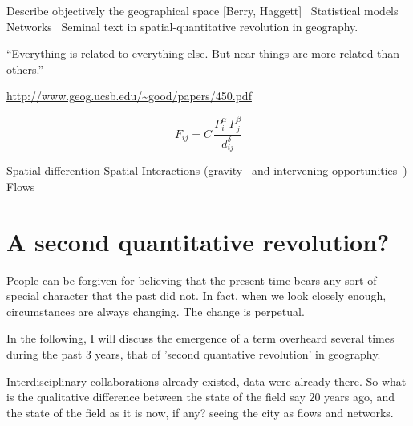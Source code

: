 Describe objectively the geographical space [Berry,
Haggett]~\cite{Hagget:1966,King:1966,Chorley:1967}
Statistical models~\cite{Brunsdon:1998}
Networks~\cite{Kansky:1963,Haggett:1969}
Seminal text in spatial-quantitative revolution in geography.~\cite{Bunge:1962}

\cite{Tobler:1970} ``Everything is related to everything else. But near things
are more related than others.''

\url{http://www.geog.ucsb.edu/~good/papers/450.pdf}

\begin{equation}
    F_{ij} = C\, \frac{P_i^\alpha\,P_j^\beta}{d_{ij}^\delta}
\end{equation}

Spatial differention
Spatial Interactions (gravity~\cite{Stewart:1948} and intervening opportunities~\cite{Stouffer:1940})
Flows~\cite{Batty:2013}

\section{A second quantitative revolution?}
\label{sec:a_second_quantitative_revolution_}

People can be forgiven for believing that the present time bears any sort of
special character that the past did not. In fact, when we look closely enough,
circumstances are always changing. The change is perpetual. 

In the following, I will discuss the emergence of a term overheard several times
during the past $3$ years, that of 'second quantative revolution' in geography.


Interdisciplinary collaborations already existed, data were already there. So
what is the qualitative difference between the state of the field say $20$ years
ago, and the state of the field as it is now, if any?\cite{Batty:2008,Batty:2012,Batty:2013} seeing the city as flows and networks.


